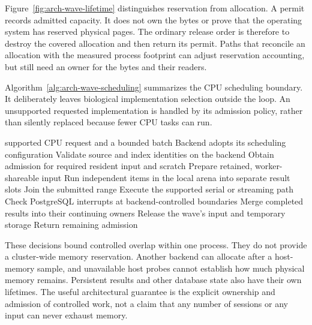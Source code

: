 Figure~\ref{fig:arch-wave-lifetime} distinguishes reservation from
allocation. A permit records admitted capacity. It does not own the bytes
or prove that the operating system has reserved physical pages. The
ordinary release order is therefore to destroy the covered allocation and
then return its permit. Paths that reconcile an allocation with the measured
process footprint can adjust reservation accounting, but still need an
owner for the bytes and their readers.

Algorithm~\ref{alg:arch-wave-scheduling} summarizes the CPU scheduling
boundary. It deliberately leaves biological implementation selection
outside the loop. An unsupported requested implementation is handled by
its admission policy, rather than silently replaced because fewer CPU
tasks can run.

\begin{algorithm}[htbp]
\caption{CPU work under backend ownership and bounded admission}
\label{alg:arch-wave-scheduling}
\small
\begin{algorithmic}[1]
  \Require supported CPU request and a bounded batch
  \State Backend adopts its scheduling configuration
    \State Validate source and index identities on the backend
    \State Obtain admission for required resident input and scratch
      \State Prepare retained, worker-shareable input
      \State Run independent items in the local arena into separate result slots
      \State Join the submitted range
    \Else
      \State Execute the supported serial or streaming path
    \EndIf
    \State Check PostgreSQL interrupts at backend-controlled boundaries
    \State Merge completed results into their continuing owners
    \State Release the wave's input and temporary storage
    \State Return remaining admission
  \EndFor
\end{algorithmic}
\end{algorithm}

These decisions bound controlled overlap within one process. They do not
provide a cluster-wide memory reservation. Another backend can allocate
after a host-memory sample, and unavailable host probes cannot establish
how much physical memory remains. Persistent results and other database
state also have their own lifetimes. The useful architectural guarantee is
the explicit ownership and admission of controlled work, not a claim that
any number of sessions or any input can never exhaust memory.

